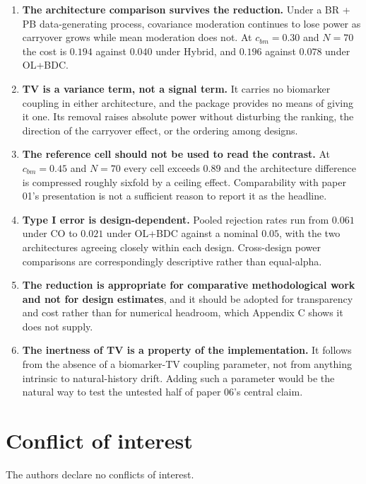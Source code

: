 \documentclass[
  11pt,
]{article}
\begin{document}
\begin{enumerate}
\def\labelenumi{\arabic{enumi}.}
\item
  \textbf{The architecture comparison survives the reduction.} Under
  a BR + PB data-generating process, covariance moderation continues
  to lose power as carryover grows while mean moderation does not.
  At \(c_{bm} = 0.30\) and \(N = 70\) the cost is \(0.194\) against
  \(0.040\) under Hybrid, and \(0.196\) against \(0.078\) under OL+BDC.
\item
  \textbf{TV is a variance term, not a signal term.} It carries no
  biomarker coupling in either architecture, and the package
  provides no means of giving it one. Its removal raises absolute
  power without disturbing the ranking, the direction of the
  carryover effect, or the ordering among designs.
\item
  \textbf{The reference cell should not be used to read the
  contrast.} At \(c_{bm} = 0.45\) and \(N = 70\) every cell exceeds
  \(0.89\) and the architecture difference is compressed roughly
  sixfold by a ceiling effect. Comparability with paper 01's
  presentation is not a sufficient reason to report it as the
  headline.
\item
  \textbf{Type I error is design-dependent.} Pooled rejection rates
  run from \(0.061\) under CO to \(0.021\) under OL+BDC against a
  nominal \(0.05\), with the two architectures agreeing closely within
  each design. Cross-design power comparisons are correspondingly
  descriptive rather than equal-alpha.
\item
  \textbf{The reduction is appropriate for comparative
  methodological work and not for design estimates}, and it should
  be adopted for transparency and cost rather than for numerical
  headroom, which Appendix C shows it does not supply.
\item
  \textbf{The inertness of TV is a property of the implementation.}
  It follows from the absence of a biomarker-TV coupling parameter,
  not from anything intrinsic to natural-history drift. Adding such
  a parameter would be the natural way to test the untested half of
  paper 06's central claim.
\end{enumerate}

\section{Conflict of interest}

The authors declare no conflicts of interest.
\end{document}
